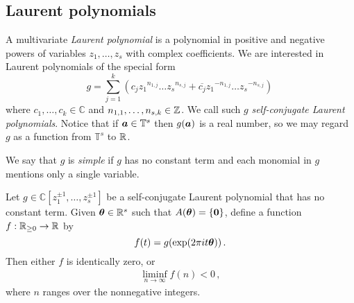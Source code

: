 \subsection{Laurent polynomials}

A multivariate \emph{Laurent polynomial} is a polynomial in positive and negative powers of variables $z_{1}, \ldots, z_{s}$ with complex coefficients. We are interested in Laurent polynomials of the special form
\[ g = \sum_{j=1}^k \left( c_j {z_1}^{n_{1,j}}\ldots {z_s}^{n_{s,j}} +
    \overline{c_j} {z_1}^{-n_{1,j}}\ldots {z_s}^{-n_{s,j}} \right) \,
\]
where $c_1,\ldots,c_k \in \mathbb{C}$ and $n_{1,1},\ldots,n_{s,k} \in \mathbb{Z}$.  We call such $g$ \emph{self-conjugate Laurent polynomials}.  Notice that if $\boldsymbol{a} \in \mathbb{T}^{s}$ then $g(\boldsymbol{a})$ is a real number, so we may regard $g$ as a function from $\mathbb{T}^{s}$ to $\mathbb{R}$.

We say that $g$ is \emph{simple} if $g$ has no constant term and
each monomial in $g$ mentions only a single variable.

\begin{lemma}
\label{lem:first_bound}
Let $g \in \mathbb{C}[z^{\pm 1}_1,\ldots,z^{\pm 1}_s]$ be a self-conjugate Laurent polynomial that has no constant term.
Given $\boldsymbol{\theta} \in \mathbb{R}^{s}$ such that $A(\boldsymbol{\theta}) = \lbrace \boldsymbol{0} \rbrace$, define a function $f: \mathbb{R}_{\geq 0} \rightarrow \mathbb{R}$ by
\[ f(t) = g(\exp(2 \pi i t \boldsymbol{\theta})) \, .\]
Then either $f$ is identically zero, or
\begin{align*}
\liminf\limits_{n\rightarrow\infty} f(n) < 0 \, ,
\end{align*}
where $n$ ranges over the nonnegative integers.
\end{lemma}

